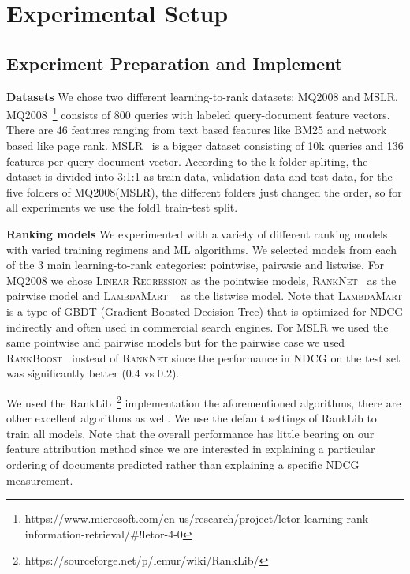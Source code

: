 \chapter{Experimental Setup}\label{ch:setup} %
\section{Experiment Preparation and Implement}
\textbf{Datasets} We chose two different learning-to-rank datasets: \textsc{MQ2008} and \textsc{MSLR}. \textsc{MQ2008}~\footnote{https://www.microsoft.com/en-us/research/project/letor-learning-rank-information-retrieval/#!letor-4-0} consists of 800 queries with labeled query-document feature vectors. There are 46 features ranging from text based features like BM25 and network based like page rank. \textsc{MSLR}~\cite{DBLP:journals/corr/QinL13} is a bigger dataset consisting of 10k queries and 136 features per query-document vector. According to the k folder spliting, the dataset is divided into 3:1:1 as train data, validation data and test data, for the five folders of MQ2008(MSLR), the different folders just changed the order, so for all experiments we use the fold1 train-test split.

\textbf{Ranking models} We experimented with a variety of different ranking models with varied training regimens and ML algorithms. We selected models from each of the 3 main learning-to-rank categories: pointwise, pairwsie and listwise. For \textsc{MQ2008} we chose \textsc{Linear Regression} as the pointwise models, \textsc{RankNet}~\cite{burges2007learning} as the pairwise model and \textsc{LambdaMart} ~\cite{burges2010ranknet} as the listwise model. Note that \textsc{LambdaMart} is a type of GBDT (Gradient Boosted Decision Tree) that is optimized for NDCG indirectly and often used in commercial search engines. For \textsc{MSLR} we used the same pointwise and pairwise models but for the pairwise case we used \textsc{RankBoost}~\cite{freund2003efficient} instead of \textsc{RankNet} since the performance in NDCG on the test set was significantly better ($0.4$ vs $0.2$).

We used the RankLib~\footnote{https://sourceforge.net/p/lemur/wiki/RankLib/} implementation the aforementioned algorithms, there are other excellent algorithms as well.  We use the default settings of RankLib to train all models. Note that the overall performance has little bearing on our feature attribution method since we are interested in explaining a particular ordering of documents predicted rather than explaining a specific NDCG measurement.  

